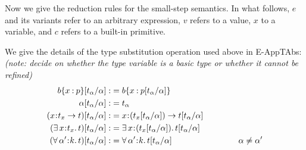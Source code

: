 \documentclass[11pt]{article}
\newcommand{\al}{\alpha}
\newcommand{\bind}{\hspace{0.05em}{:}\hspace{0.05em}} %
\newcommand{\col}{\mathbin{:}}       %
\newcommand{\step}{\hookrightarrow}
\newcommand{\existype}[3]{\exists\, #1\bind #2.\, #3}
\newcommand{\polytype}[3]{\forall\, #1\bind #2.\, #3}
\newcommand{\functype}[3]{#1\bind #2 \rightarrow #3}
\newcommand{\letin}[3]{{\tt let}\,#1\hspace{0.1em}{=}\hspace{0.1em}#2\,{\tt in}\,#3}
\begin{document}
Now we give the reduction rules for the small-step semantics. In what follows, $e$ and its variants refer to an arbitrary expression, $v$ refers to a value, $x$ to a variable, and $c$  refers to a built-in primitive.

We give the details of the type substitution operation used above in {\sc E-AppTAbs}: {\em (note: decide on whether the type variable is a basic type or whether it  cannot be refined)}
\begin{align*}
b\{x\col p\}[t_\al/\al] :&= b\{x\col p[t_\al/\al]\} \\
\al[t_\al/\al] :&= t_\al \\
(\functype{x}{t_x}{t})[t_\al/\al] :&= \functype{x}{(t_x[t_\al/\al])}{t[t_\al/\al]} \\
(\existype{x}{t_x}{t})[t_\al/\al] :&= \existype{x}{(t_x[t_\al/\al])}{t[t_\al/\al]} \\
(\polytype{\al'}{k}{t})[t_\al/\al] :&= \polytype{\al'}{k}{t[t_\al/\al]} \quad\quad\quad\quad\quad\quad\quad\quad \al \neq \al'
\end{align*}
\end{document}
